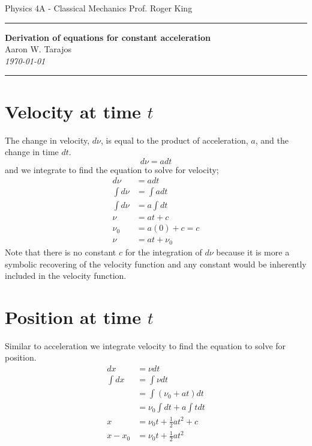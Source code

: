 \documentclass{article}
\begin{document}
Physics 4A - Classical Mechanics \hfill Prof. Roger King

\noindent\rule{\textwidth}{0.4pt}

\begin{center}
    \textbf{\LARGE Derivation of equations for constant acceleration} \\
    \vspace{12pt}
    \large Aaron W. Tarajos \\
    \textit{\today}
\end{center}

\noindent\rule{\textwidth}{0.4pt}

\section*{Velocity at time $t$}
The change in velocity, $d\nu$, is equal to the product of acceleration, $a$, and the change in time $dt$.
\[
	d\nu = a dt
\]
and we integrate to find the equation to solve for velocity;
\begin{align*}
	d\nu &= adt \\
	\int d\nu &= \int adt \\
	\int d\nu &= a \int dt \\
	\nu &= at + c \\
	\nu_0 &= a(0) + c = c \\
	\nu &= at + \nu_0
\end{align*}
Note that there is no constant $c$ for the integration of $d\nu$ because it is more a symbolic recovering of the velocity function and any constant would be inherently included in the velocity function.

\section*{Position at time $t$}
Similar to acceleration we integrate velocity to find the equation to solve for position.
\begin{align*}
	dx &= \nu dt \\
	\int dx &= \int \nu dt \\
	&= \int \left( \nu_0 + at \right) dt \\
	&= \nu_0 \int dt + a \int tdt \\
	x &= \nu_0t + \frac{1}{2} at^2 + c \\
	x-x_0 &= \nu_0t + \frac{1}{2} at^2 \\
\end{align*}
\end{document}
